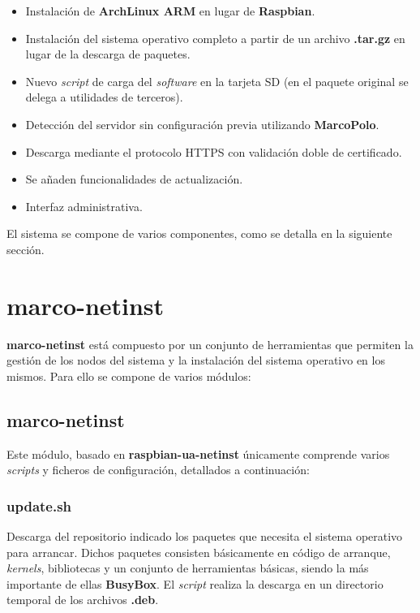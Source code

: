 \documentclass{article}
\begin{document}
\begin{itemize}
	\item Instalación de \textbf{ArchLinux ARM} en lugar de \textbf{Raspbian}.
	\item Instalación del sistema operativo completo a partir de un archivo \textbf{.tar.gz} en lugar de la descarga de paquetes.
	\item Nuevo \textit{script} de carga del \textit{software} en la tarjeta SD (en el paquete original se delega a utilidades de terceros).
	\item Detección del servidor sin configuración previa utilizando \textbf{MarcoPolo}.
	\item Descarga mediante el protocolo HTTPS con validación doble de certificado.
	\item Se añaden funcionalidades de actualización.
	\item Interfaz administrativa.
\end{itemize}

El sistema se compone de varios componentes, como se detalla en la siguiente sección.

\section{marco-netinst}

\textbf{marco-netinst} está compuesto por un conjunto de herramientas que permiten la gestión de los nodos del sistema y la instalación del sistema operativo en los mismos. Para ello se compone de varios módulos:

\subsection{marco-netinst}

Este módulo, basado en \textbf{raspbian-ua-netinst} únicamente comprende varios \textit{scripts} y ficheros de configuración, detallados a continuación:

\subsubsection*{update.sh}

Descarga del repositorio indicado los paquetes que necesita el sistema operativo para arrancar. Dichos paquetes consisten básicamente en código de arranque, \textit{kernels}, bibliotecas y un conjunto de herramientas básicas, siendo la más importante de ellas \textbf{BusyBox}. El \textit{script} realiza la descarga en un directorio temporal de los archivos \textbf{.deb}.
\end{document}
